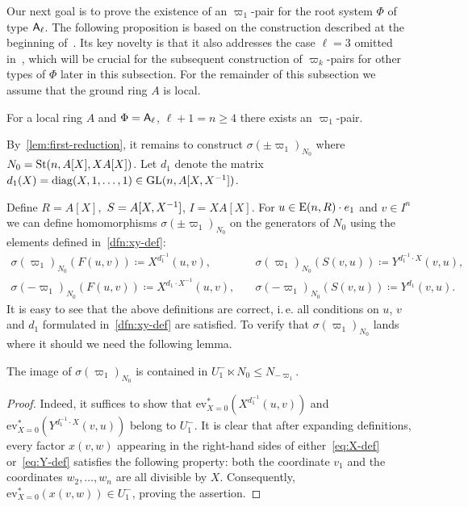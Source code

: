 Our next goal is to prove the existence of an $\varpi_1$-pair for the root system $\Phi$ of type $\mathsf{A}_\ell$.
The following proposition is based on the construction described at the beginning of~\cite[\S~3]{Tu83}.
Its key novelty is that it also addresses the case \( \ell = 3 \) omitted in~\cite{Tu83}, which will be crucial for the subsequent construction of \( \varpi_k \)-pairs for other types of \( \Phi \) later in this subsection.
For the remainder of this subsection we assume that the ground ring $A$ is local.

\begin{prop} \label{prop:sigma-construction}
    For a local ring $A$ and $\Phi = \mathsf{A}_\ell$, $\ell + 1 = n \geq 4$ there exists an $\varpi_1$-pair.
\end{prop}

By~\eqref{lem:first-reduction}, it remains to construct $\sigma(\pm\varpi_1)_{N_0}$ where $N_0 = \operatorname{St}(n, A[X], XA[X])$.
Let \( d_1 \) denote the matrix $d_1(X) = \mathrm{diag}(X, 1, \ldots, 1) \in \operatorname{GL}(n, A[X, X^{-1}])$.

Define $R = A[X],$ $S = A[X, X^{-1}]$, $I = XA[X].$
For $u \in \operatorname{E}(n, R) \cdot e_1$ and $v \in I^n$ we can define homomorphisms $\sigma(\pm\varpi_1)_{N_0}$ on the generators of $N_{0}$ using the elements defined in~\cref{dfn:xy-def}:
\begin{align}
    \sigma(\varpi_1)_{N_0} \left(F(u, v)\right) \coloneqq X^{d_1^{-1}}(u, v), & \quad \sigma(\varpi_1)_{N_0} \left(S(v, u)\right) \coloneqq Y^{d_1^{-1} \cdot X}(v, u), \label{eq:def-sigma-1} \\
    \sigma(-\varpi_1)_{N_0} \left(F(u, v)\right) \coloneqq X^{d_1 \cdot X^{-1}}(u, v),& \quad \sigma(-\varpi_1)_{N_0} \left(S(v, u)\right) \coloneqq Y^{d_1}(v, u). \label{eq:def-sigma-2}
\end{align}
It is easy to see that the above definitions are correct, i.\,e. all conditions on $u$, $v$ and $d_1$ formulated in~\cref{dfn:xy-def} are satisfied.
To verify that $\sigma(\varpi_1)_{N_0}$ lands where it should we need the following lemma.
\begin{lemma}\label{lem:sigma-N0-image}
    The image of $\sigma(\varpi_1)_{N_0}$ is contained in $U_1^- \ltimes N_0 \leq N_{-\varpi_1}$.
\end{lemma}
\begin{proof}
Indeed, it suffices to show that $\mathrm{ev}_{X=0}^*(X^{d_1^{-1}}(u, v))$ and $\mathrm{ev}_{X=0}^*(Y^{d^{-1}_1 \cdot X}(v, u))$ belong to $U_1^-$.
It is clear that after expanding definitions, every factor $x(v, w)$ appearing in the right-hand sides of either~\eqref{eq:X-def} or~\eqref{eq:Y-def}
satisfies the following property: both the coordinate $v_1$ and the coordinates $w_2, \ldots, w_n$ are all divisible by $X$.
Consequently, $\mathrm{ev}_{X=0}^* \left(x(v, w)\right) \in U_1^-$, proving the assertion.
\end{proof}

